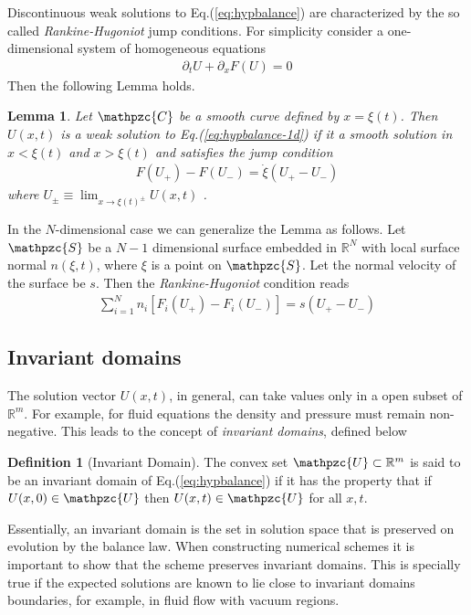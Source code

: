 \documentclass[11pt, reqno]{amsart}
\newcommand{\eqr}[1]{Eq.\thinspace(#1)}
\newcommand{\spfrac}[2]{{\partial_{#1}} {#2}}
\newcommand{\script}[1]{\mathpzc{#1}}
\newtheorem{lem}{Lemma}
\theoremstyle{definition}
\newtheorem{dfn}{Definition}
\begin{document}
Discontinuous weak solutions to \eqr{\ref{eq:hypbalance}} are
characterized by the so called \emph{Rankine-Hugoniot} jump
conditions. For simplicity consider a one-dimensional system of
homogeneous equations
\begin{align}
  \spfrac{t}{U} + \spfrac{x}{F(U)} = 0
  \label{eq:hypbalance-1d}
\end{align}
Then the following Lemma holds.
\begin{lem}
  \label{lem:rg-condition}
  Let $\script{C}$ be a smooth curve defined by $x=\xi(t)$. Then
  $U(x,t)$ is a \emph{weak} solution to \eqr{\ref{eq:hypbalance-1d}}
  if it a smooth solution in $x<\xi(t)$ and $x>\xi(t)$ and satisfies
  the jump condition
  \begin{align}
    F(U_+) - F(U_-) = \dot{\xi}(U_+ - U_-)
  \end{align}
  where $U_\pm \equiv \lim_{x\rightarrow \xi(t)^\pm}U(x,t)$ .
\end{lem}

In the $N$-dimensional case we can generalize the Lemma as
follows. Let $\script{S}$ be a $N-1$ dimensional surface embedded in
$\mathbb{R}^N$ with local surface normal $n(\xi,t)$, where $\xi$ is a
point on $\script{S}$. Let the normal velocity of the surface be
$s$. Then the \emph{Rankine-Hugoniot} condition reads
\begin{align}
  \sum_{i=1}^N 
  n_i[F_i(U_+) - F_i(U_-)] = s(U_+ - U_-)
\end{align}

\subsection{Invariant domains}

The solution vector $U(x,t)$, in general, can take values only in a
open subset of $\mathbb{R}^m$. For example, for fluid equations the
density and pressure must remain non-negative. This leads to the
concept of \emph{invariant domains}, defined below
\begin{dfn}[Invariant Domain]
  The convex set $\script{U} \subset \mathbb{R}^m$ is said to be an
  invariant domain of \eqr{\ref{eq:hypbalance}} if it has the property
  that if $U(x,0) \in \script{U}$ then $U(x,t) \in \script{U}$ for all
  $x,t$.
\end{dfn}

Essentially, an invariant domain is the set in solution space that is
preserved on evolution by the balance law. When constructing numerical
schemes it is important to show that the scheme preserves invariant
domains. This is specially true if the expected solutions are known to
lie close to invariant domains boundaries, for example, in fluid flow
with vacuum regions.
\end{document}
